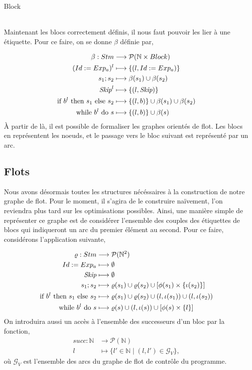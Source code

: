 \documentclass[a4paper, 12pt]{article}
\begin{document}
\begin{dtype}{Block}
	\\
	\\
	\akind{\sskip}
\end{dtype}
Maintenant les blocs correctement définis, il nous faut pouvoir les lier à une étiquette. Pour ce faire, on se donne $\beta$ définie par,

\begin{align*}
	\beta : Stm &\longrightarrow \mathcal{P}(\mathbb{N} \times Block)\\
	({Id}\space:=\space{Exp_a})^l&\longmapsto\{(l, Id := Exp_a)\}\\
	{s_1}\space;\space{s_2} &\longmapsto \beta(s_1) \cup \beta(s_2)\\
	\textit{Skip}^l &\longmapsto \{(l, \textit{Skip})\}\\
	\text{if }{b^l}\text{ then }{s_1}\text{ else }{s_2} &\longmapsto \{(l, b)\}\cup \beta(s_1)\cup\beta(s_2)\\
	\text{while }{b^l}\text{ do }{s} &\longmapsto \{(l, b)\}\cup\beta(s)
\end{align*}
À partir de là, il est possible de formaliser les graphes orientés de flot. Les blocs en représentent les noeuds, et le passage 
vers le bloc suivant est représenté par un arc.

\subsection{Flots}
Nous avons désormais toutes les structures nécéssaires à la construction de notre graphe de flot. Pour le moment, il s'agira de 
le construire naïvement, l'on reviendra plus tard sur les optimisations possibles. Ainsi, une manière simple de représenter ce 
graphe est de considérer l'ensemble des couples des étiquettes de blocs qui indiqueront un arc du premier élément au second. 
Pour ce faire, considérons l'application suivante, 

\begin{align*}
	\varrho : Stm &\longrightarrow \mathcal{P}(\mathbb{N}^2) \\
	{Id}\space:=\space{Exp_a} &\longmapsto \emptyset \\
	\textit{Skip} &\longmapsto \emptyset \\
	{s_1}\space;\space{s_2} &\longmapsto \varrho(s_1) \cup \varrho(s_2) \cup [\phi(s_1)\times\{\iota(s_2)\}] \\
	\text{if }{b^l}\text{ then }{s_1}\text{ else }{s_2} &\longmapsto \varrho(s_1)\cup\varrho(s_2)\cup(l, \iota(s_1))\cup(l, \iota(s_2)) \\
	\text{while }{b^l}\text{ do }{s} &\longmapsto \varrho(s)\cup(l,\iota(s))\cup[\phi(s)\times\{l\}]
\end{align*}
On introduira aussi un accès à l'ensemble des successeurs d'un bloc par la fonction,
\begin{align*}
	succ : \mathbb{N} &\longrightarrow \mathcal{P}(\mathbb{N})\\
	l &\longmapsto \{l' \in \mathbb{N} \mid (l, l') \in \mathcal{G}_V\},
\end{align*}
où $\mathcal{G}_V$ est l'ensemble des arcs du graphe de flot de contrôle du programme.
\end{document}
